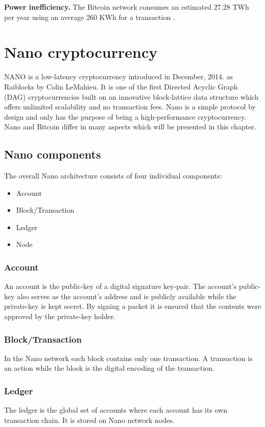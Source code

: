 \documentclass{ferseminar}
\begin{document}
\textbf{Power inefficiency.} The Bitcoin network consumes an estimated 27.28 TWh per year using an average 260 KWh for a transaction \cite{Nano}.

\section{Nano cryptocurrency}

NANO is a low-latency cryptocurrency introduced in December, 2014. as Raiblocks by Colin LeMahieu. It is one of the first Directed Acyclic Graph (DAG) cryptocurrencies built on an innovative block-lattice data structure which offers unlimited scalability and no transaction fees. Nano is a simple protocol by design and only has the purpose of being a high-performance cryptocurrency. Nano and Bitcoin differ in many aspects which will be presented in this chapter.

\subsection{Nano components}
The overall Nano architecture consists of four individual components:
\begin{itemize}
	\item Account
	\item Block/Transaction
	\item Ledger
	\item Node
\end{itemize}

\subsubsection{Account}
An account is the public-key of a digital signature key-pair. The account's public-key also serves as the account's address and is publicly available while the private-key is kept secret. By signing a packet it is ensured that the contents were approved by the private-key holder. 

\subsubsection{Block/Transaction}
In the Nano network each block contains only one transaction. A transaction is an action while the block is the digital encoding of the transaction.

\subsubsection{Ledger}
The ledger is the global set of accounts where each account has its own transaction chain. It is stored on Nano network nodes.
\end{document}

